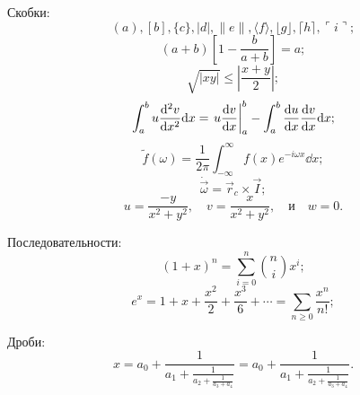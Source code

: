 Скобки:
\begin{equation}
    ( a ), [ b ], \{ c \}, | d |, \| e \|, \langle f \rangle, \lfloor g \rfloor, \lceil h \rceil, \ulcorner i \urcorner;
\end{equation}
\begin{equation}
    \left( a + b \right) \left[ 1 - \frac{b}{a+b} \right] = a;
\end{equation}
\begin{equation}
    \sqrt{|xy|} \leq \left| \frac{x + y}{2} \right|;
\end{equation}
\begin{equation}
    \int_a^b u \dv[2]{v}{x} \dd x = \left. u \dv{v}{x} \right|_a^b -\int_a^b \dv{u}{x} \dv{v}{x} \dd x;
\end{equation}
\begin{equation}
    \tilde f(\omega) = \frac{1}{2\pi} \int_{-\infty}^\infty f(x)e^{-i\omega x} \dd x;
\end{equation}
\begin{equation}
    \dot{\vec \omega} = \vec r_c \times \vec I;
\end{equation}
\begin{equation}
    u = \frac{-y}{x^2 + y^2}, \quad v = \frac{x}{x^2 + y^2}, \quad \text{и} \quad w = 0.
\end{equation}

Последовательности:
\begin{equation}
    (1+x)^n = \sum_{i=0}^n \binom{n}{i} x^i;
\end{equation}
\begin{equation}
    e^x = 1 + x + \frac{x^2}{2} + \frac{x^3}{6} + \cdots = \sum_{n \ge 0} \frac{x^n}{n!};
\end{equation}

Дроби:
\begin{equation}
    x = 
    a_0 + \frac{1}{a_1 + \frac{1}{a_2 + \frac{1}{a_3 + a_4}}}
    =
    a_0 + \frac{1}{\displaystyle a_1
        + \frac{1}{\displaystyle a_2
        + \frac{1}{\displaystyle a_3 + a_4}}}.
\end{equation}

